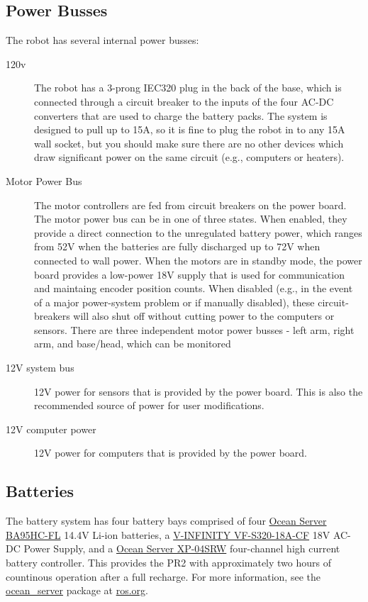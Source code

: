 \subsection{Power Busses}
The robot has several internal power busses:
\begin{description}
\item[120v] The robot has a 3-prong IEC320 plug in the back of the base, which is connected through a circuit breaker to the inputs of the four AC-DC converters that are used to charge the battery packs.  The system is designed to pull up to 15A, so it is fine to plug the robot in to any 15A wall socket, but you should make sure there are no other devices which draw significant power on the same circuit (e.g., computers or heaters).
\item[Motor Power Bus] The motor controllers are fed from circuit breakers on the power board. The motor power bus can be in one of three states.  When enabled, they provide a direct connection to the unregulated battery power, which ranges from 52V when the batteries are fully discharged up to 72V when connected to wall power.  When the motors are in standby mode, the power board provides a low-power 18V supply that is used for communication and maintaing encoder position counts.  When disabled (e.g., in the event of a major power-system problem or if manually disabled), these circuit-breakers will also shut off without cutting power to the computers or sensors.  There are three independent motor power busses - left arm, right arm, and base/head, which can be monitored 
\item[12V system bus]
12V power for sensors that is provided by the power board.  This is also the recommended source of power for user modifications.
\item[12V computer power]
12V power for computers that is provided by the power board.
\end{description}
\subsection{Batteries}
The battery system has four battery bays comprised of four \href{http://www.oceanserver-store.com/18.html}{Ocean Server BA95HC-FL}
14.4V Li-ion batteries, a \href{http://www.v-infinity.com/adtemplate_child.asp?c=710918&p=903285&catky=764537&subcatky1=46887&subcatky2=320934}{V-INFINITY VF-S320-18A-CF}
18V AC-DC Power Supply, and a \href{http://www.oceanserver-store.com/xpmibamamo.html}{Ocean Server XP-04SRW} four-channel high 
current battery controller. This provides the PR2 with approximately two hours of countinous operation after a full recharge. 
For more information, see the \href{http://www.ros.org/wiki/ocean\_server}{ocean\_server} package at \href{http://www.ros.org}{ros.org}.

